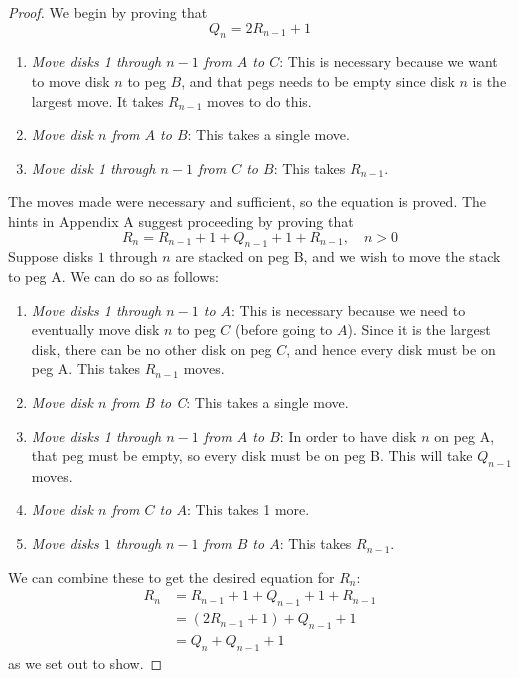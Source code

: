 \documentclass[12pt]{article}
\newenvironment{sol}[1][Solution]{\begin{trivlist}
		\item[\hskip \labelsep {\bfseries #1:}]}{\end{trivlist}}
\begin{document}
\begin{sol}
	\begin{proof}
		We begin by proving that
		\[
		Q_n=2R_{n-1}+1
		\]
		\begin{enumerate}[label=(\alph*)]
			\item \emph{Move disks 1 through $n-1$ from $A$ to $C$}: This is necessary
			because we want to move disk $n$ to peg $B$, and that pegs needs to be
			empty since disk $n$ is the largest move. It takes $R_{n-1}$ moves to
			do this.
			\item \emph{Move disk $n$ from $A$ to $B$}: This takes a single move.
			\item \emph{Move disk 1 through $n-1$ from $C$ to $B$}: This takes
			$R_{n-1}$.
		\end{enumerate}
		The moves made were necessary and sufficient, so the equation is proved.
		The hints in Appendix A suggest proceeding by proving that
		\[
		R_n=R_{n-1}+1+Q_{n-1}+1+R_{n-1},\quad n>0
		\]
		Suppose disks $1$ through $n$ are stacked on peg B, and we wish to move
		the stack to peg A. We can do so as follows:
		\begin{enumerate}[label=(\roman*)]
			\item \emph{Move disks 1 through $n-1$ to $A$}: This is necessary because we
			need to eventually move disk $n$ to peg $C$ (before going to $A$). Since it
			is the largest disk, there can be no other disk on peg $C$, and hence every
			disk must be on peg A. This takes $R_{n-1}$ moves.
			\item \emph{Move disk $n$ from B to C}: This takes a single move.
			\item \emph{Move disks 1 through $n-1$ from $A$ to $B$}: In order to have
			disk $n$ on peg A, that peg must be empty, so every disk must be on peg B.
			This will take $Q_{n-1}$ moves.
			\item \emph{Move disk $n$ from $C$ to $A$}: This takes 1 more.
			\item \emph{Move disks $1$ through $n-1$ from $B$ to $A$}: This takes
			$R_{n-1}$.
		\end{enumerate}
		We can combine these to get the desired equation for $R_n$:
		\begin{align*}
			R_{n}&=R_{n-1}+1+Q_{n-1}+1+R_{n-1}\\
			&=(2R_{n-1}+1)+Q_{n-1}+1\\
			&=Q_n+Q_{n-1}+1
		\end{align*}
		as we set out to show.
	\end{proof}
\end{sol}
\end{document}
